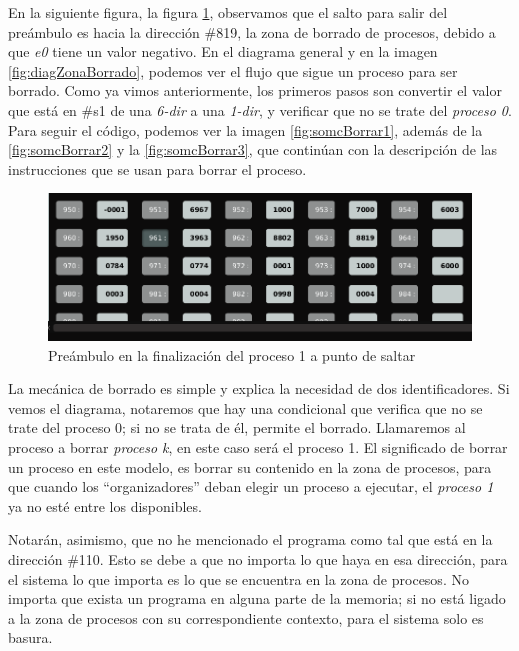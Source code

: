 \documentclass[letterpaper,12pt,oneside]{book}
\begin{document}
		En la siguiente figura, la figura \ref{fig:proceso1FinishPream2}, observamos que el 
		salto
		para salir del preámbulo es hacia la dirección \#819, la zona de borrado de procesos,
		debido a que \textit{e0} tiene un valor negativo. En el diagrama general y en la imagen \ref{fig:diagZonaBorrado}, podemos
		ver el flujo que sigue un proceso para ser borrado. Como ya vimos anteriormente, los primeros pasos son convertir
		el valor que está en \#s1 de una \textit{6-dir} a una \textit{1-dir}, y verificar que no se trate del \textit{proceso 0}. Para seguir
		el código, podemos ver la imagen \ref{fig:somcBorrar1}, además de la \ref{fig:somcBorrar2} y la \ref{fig:somcBorrar3}, que
		continúan con la descripción de las instrucciones que se usan para 
		borrar el proceso.
		
		
		\begin{figure}[h]		
			\centering
			\includegraphics[scale=0.4]{media/CARDIACC/proceso1FinishPream2_cut.png}
			\caption{ Preámbulo en la finalización del proceso 1 a punto de saltar}
			\label{fig:proceso1FinishPream2}
		\end{figure}
		
		La mecánica de borrado es simple y explica la necesidad de dos identificadores. Si vemos el diagrama, notaremos que
		hay una condicional que verifica que no se trate del proceso 0; si no se trata de él, permite el borrado. Llamaremos al proceso
		a borrar \textit{proceso k}, en este caso será el proceso 1. El significado de borrar un proceso en este modelo,
		es borrar su contenido en la zona de procesos, para que cuando los ``organizadores''  deban elegir un proceso a ejecutar,
		 el \textit{proceso 1} ya no esté entre los disponibles.
		
		Notarán, asimismo, que no he mencionado el programa como tal que está en la dirección \#110. Esto se debe
		a que no importa lo que haya en esa dirección, para el sistema
		lo que importa es lo que se encuentra en la zona de procesos. No importa que exista un programa
		en alguna parte de la memoria; si no está ligado a la zona de procesos con su correspondiente
		contexto, para el sistema solo es basura.
		
\end{document}
